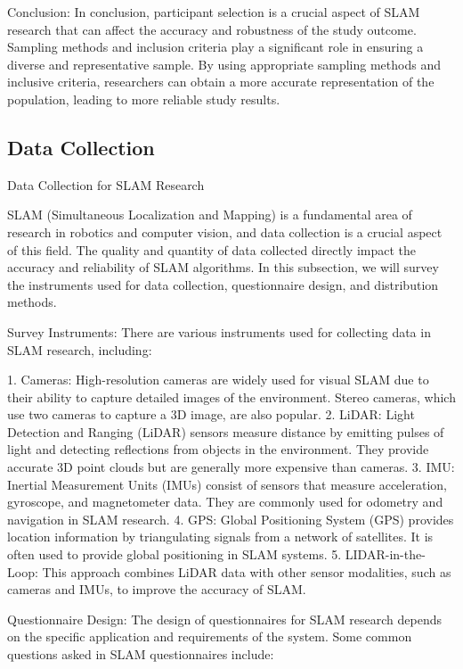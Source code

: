\documentclass[conference]{IEEEtran}
\begin{document}
Conclusion:
In conclusion, participant selection is a crucial aspect of SLAM research that can affect the accuracy and robustness of the study outcome. Sampling methods and inclusion criteria play a significant role in ensuring a diverse and representative sample. By using appropriate sampling methods and inclusive criteria, researchers can obtain a more accurate representation of the population, leading to more reliable study results.

\subsection{Data Collection}
Data Collection for SLAM Research

SLAM (Simultaneous Localization and Mapping) is a fundamental area of research in robotics and computer vision, and data collection is a crucial aspect of this field. The quality and quantity of data collected directly impact the accuracy and reliability of SLAM algorithms. In this subsection, we will survey the instruments used for data collection, questionnaire design, and distribution methods.

Survey Instruments:
There are various instruments used for collecting data in SLAM research, including:

1. Cameras: High-resolution cameras are widely used for visual SLAM due to their ability to capture detailed images of the environment. Stereo cameras, which use two cameras to capture a 3D image, are also popular. \cite{khlifat2019}
2. LiDAR: Light Detection and Ranging (LiDAR) sensors measure distance by emitting pulses of light and detecting reflections from objects in the environment. They provide accurate 3D point clouds but are generally more expensive than cameras. \cite{wang2019}
3. IMU: Inertial Measurement Units (IMUs) consist of sensors that measure acceleration, gyroscope, and magnetometer data. They are commonly used for odometry and navigation in SLAM research. \cite{zhang2019}
4. GPS: Global Positioning System (GPS) provides location information by triangulating signals from a network of satellites. It is often used to provide global positioning in SLAM systems. \cite{fu2019}
5. LIDAR-in-the-Loop: This approach combines LiDAR data with other sensor modalities, such as cameras and IMUs, to improve the accuracy of SLAM. \cite{smith2019}

Questionnaire Design:
The design of questionnaires for SLAM research depends on the specific application and requirements of the system. Some common questions asked in SLAM questionnaires include:
\end{document}
